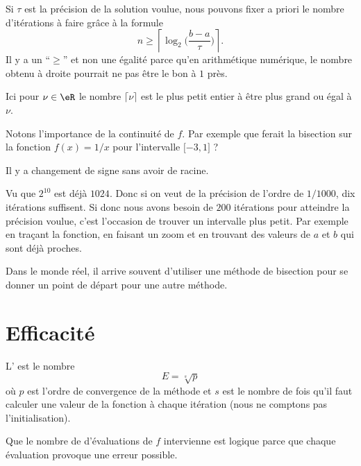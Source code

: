 Si \( \tau\) est la précision de la solution voulue, nous pouvons fixer a priori le nombre d'itérations à faire grâce à la formule
\begin{equation}
    n\geq\left\lceil  \log_2\big( \frac{ b-a }{ \tau } \big)  \right\rceil.
\end{equation}
Il y a un ``\( \geq\)'' et non une égalité parce qu'en arithmétique numérique, le nombre obtenu à droite pourrait ne pas être le bon à \( 1\) près.

Ici pour \( \nu\in \eR\) le nombre \( \lceil\nu\rceil\) est le plus petit entier à être plus grand ou égal à \( \nu\).

\begin{normaltext}
    Notons l'importance de la continuité de \( f\). Par exemple que ferait la bisection sur la fonction \( f(x)=1/x\) pour l'intervalle $\mathopen[ -3 , 1 \mathclose]$ ?

    Il y a changement de signe sans avoir de racine.
\end{normaltext}

Vu que \( 2^{10}\) est déjà \( 1024\). Donc si on veut de la précision de l'ordre de \( 1/1000\), dix itérations suffisent. Si donc nous avons besoin de \( 200\) itérations pour atteindre la précision voulue, c'est l'occasion de trouver un intervalle plus petit. Par exemple en traçant la fonction, en faisant un zoom et en trouvant des valeurs de \( a\) et \( b\) qui sont déjà proches.


\begin{normaltext}
    Dans le monde réel, il arrive souvent d'utiliser une méthode de bisection pour se donner un point de départ pour une autre méthode.
\end{normaltext}

\section{Efficacité}

\begin{definition}
    L' est le nombre
    \begin{equation}
        E=\sqrt[s]{ p }
    \end{equation}
    où \( p\) est l'ordre de convergence de la méthode et \( s\) est le nombre de fois qu'il faut calculer une valeur de la fonction à chaque itération (nous ne comptons pas l'initialisation).
\end{definition}
Que le nombre de d'évaluations de \( f\) intervienne est logique parce que chaque évaluation provoque une erreur possible.

